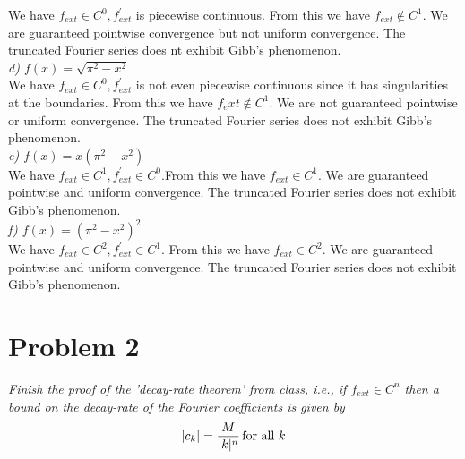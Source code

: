 \documentclass[12pt]{article}
\DeclarePairedDelimiter \abs{\lvert}{\rvert}%
\theoremstyle{remark}
\begin{document}
We have $f_{ext} \in C^0, f^\prime_{ext}$ is piecewise continuous. From this we have $f_{ext} \not\in C^1$. We are guaranteed pointwise convergence but not uniform convergence. The truncated Fourier series does nt exhibit Gibb's phenomenon. \\  

\textit{d) $f(x) = \sqrt{\pi^2 - x^2}$} \\

We have $f_{ext} \in C^0, f^\prime_{ext}$ is not even piecewise continuous since it has singularities at the boundaries. From this we have $f_ext \not\in C^1$. We are not guaranteed pointwise or uniform convergence. The truncated Fourier series does not exhibit Gibb's phenomenon. \\

\textit{e) $f(x) = x(\pi^2 - x^2)$} \\

We have $f_{ext} \in C^1, f^\prime_{ext} \in C^0$.From this we have $f_{ext} \in C^1$. We are guaranteed pointwise and uniform convergence. The truncated Fourier series does not exhibit Gibb's phenomenon. \\

\textit{f) $f(x) = (\pi^2 - x^2)^2$} \\

We have $f_{ext} \in C^2, f^\prime_{ext} \in C^1$. From this we have $f_{ext} \in C^2$. We are guaranteed pointwise and uniform convergence. The truncated Fourier series does not exhibit Gibb's phenomenon.

\newpage

\section*{Problem 2}

\textit{Finish the proof of the 'decay-rate theorem' from class, i.e., if $f_{ext} \in C^n$ then a bound on the decay-rate of the Fourier coefficients is given by}
\begin{align}
	\abs{c_k} = \frac{M}{\abs{k}^n} \, \text{for all $k$}
\end{align}
\end{document}
